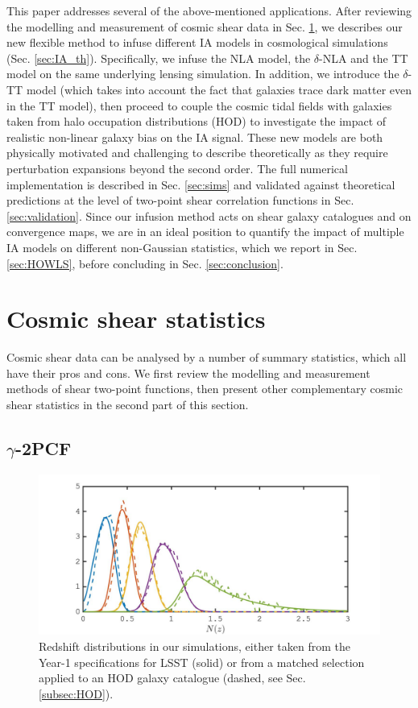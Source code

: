 \documentclass[useAMS,usenatbib]{mn2e}
\begin{document}
This paper addresses several of the above-mentioned applications. After reviewing the modelling and measurement of cosmic shear data in Sec. \ref{sec:theory},  we describes our new flexible method to infuse different IA models in cosmological simulations (Sec. \ref{sec:IA_th}).  Specifically, we  infuse the NLA model, the $\delta$-NLA  and the TT model on the same underlying lensing simulation. In addition, we introduce the $\delta$-TT model (which takes into account the fact that galaxies trace dark matter even in the TT model), then proceed to couple the cosmic tidal fields with galaxies taken from halo occupation distributions (HOD) to investigate the impact of realistic non-linear galaxy bias on the IA signal. These new models are both physically motivated and challenging to describe theoretically as they require perturbation expansions beyond the second order.  The full numerical implementation is described in Sec. \ref{sec:sims} and validated against theoretical predictions at the level of  two-point shear correlation functions in Sec. \ref{sec:validation}.  Since our infusion method acts on shear galaxy catalogues and on convergence maps, we are in an ideal position to quantify the impact of multiple IA models on different non-Gaussian statistics, which we report in Sec. \ref{sec:HOWLS}, before concluding in Sec. \ref{sec:conclusion}.  


\section{Cosmic shear statistics}
\label{sec:theory}

Cosmic shear data can be analysed by a number of summary statistics, which all have their pros and cons. We first review the modelling and measurement methods of shear  two-point functions, then present other complementary cosmic shear statistics in the second part of this section.  
\subsection{$\gamma$-2PCF}
\label{subsec:wl-th}


\begin{figure}
\includegraphics[width=\columnwidth]{graphs/Nz}
\caption{Redshift distributions in our simulations, either taken from the Year-1 specifications for LSST (solid) or from a matched selection applied to an HOD galaxy catalogue (dashed, see Sec. \ref{subsec:HOD}).}
\label{fig:Nz}
\end{figure}
\end{document}
